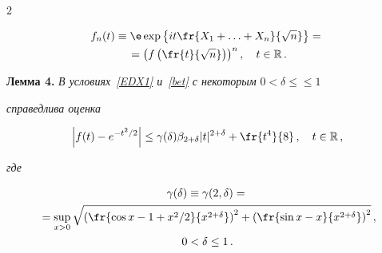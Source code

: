 \begin{multicols}{2}
\vspace*{-12pt}





\noindent


\begin{multline*}


f_n(t)\equiv\e\exp\left\{it\fr{X_1+\ldots+X_n}{\sqrt{n}}\right\}={}\\


{}=


\left(f\left(\fr{t}{\sqrt n}\right)\right)^n,\quad t\in\R\,.


\end{multline*}





\smallskip





\noindent


\textbf{Лемма 4.} \textit{В условиях~\eqref{EDX1} и~\eqref{bet} с некоторым} $0<\delta\le$\linebreak $\le 1$


\textit{справедлива оценка}


$$


\left|f(t)-e^{-t^2/2}\right|\le \gamma(\delta)\bet|t|^{2+\delta}+\fr{t^4}{8}\,, \quad


t\in\R\,,


$$


\textit{где}


\vspace*{-2pt}





\noindent


\begin{multline*}


\gamma(\delta)\equiv\gamma(2,\delta)={}\\


{}= \sup_{x>0}\sqrt{\left(\fr{\cos


x-1+x^2/2}{x^{2+\delta}}\right)^2 + \left(\fr{\sin


x-x}{x^{2+\delta}}\right)^2 }\,,\\


 0<\delta\le1\,.


\end{multline*}





\smallskip






\end{multicols}
